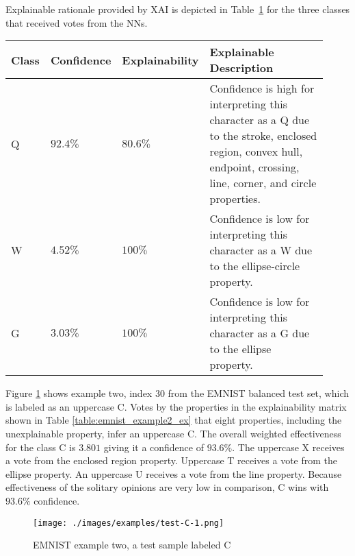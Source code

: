 Explainable rationale provided by XAI is depicted in
Table~\ref{table:emnist_example1_explanation} for the three classes that received
votes from the NNs.

\begin{table}[H]
    \renewcommand{\arraystretch}{1.3}
     \label{table:emnist_example1_explanation}
    \begin{center}
    \begin{tabular}{| m{0.06\linewidth} | m{0.14\linewidth} | m{0.17\linewidth} | m{0.55\linewidth} |}
    \hline
     Class & Confidence & Explainability & Explainable Description \\
    \hline \hline
    Q & $92.4\%$ & $80.6\%$ & Confidence is high for interpreting this character as a Q due to the stroke, enclosed region, convex hull, endpoint, crossing, line, corner, and circle properties. \\ 
    \hline
    W & $4.52\%$ & $100\%$ & Confidence is low for interpreting this character as a W due to the ellipse-circle property. \\
    \hline
    G & $3.03\%$ & $100\%$ & Confidence is low for interpreting this character as a G due to the ellipse property. \\
    \hline
    \end{tabular}
    \end{center}
\end{table}

Figure \ref{fig:ex2} shows example two, index 30 from the EMNIST balanced test
set, which is labeled as an uppercase C. Votes by the properties in the
explainability matrix shown in Table \ref{table:emnist_example2_ex} that eight
properties, including the unexplainable property, infer an uppercase C. The
overall weighted effectiveness for the class C is $3.801$ giving it a confidence
of $93.6\%$. The uppercase X receives a vote from the enclosed region property.
Uppercase T receives a vote from the ellipse property. An uppercase U receives a
vote from the line property.  Because effectiveness of the solitary opinions are
very low in comparison, C wins with $93.6\%$ confidence.

\begin{figure}[H]
    \centering
    \texttt{[image: ./images/examples/test-C-1.png]}
    \caption{EMNIST example two, a test sample labeled C}
    \label{fig:ex2}
\end{figure}

